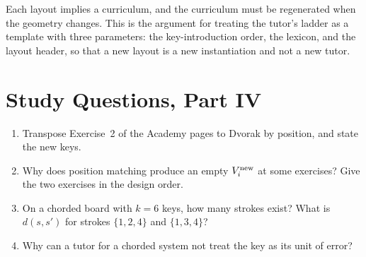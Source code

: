 Each layout implies a curriculum, and the curriculum must be regenerated when the geometry changes. This is the argument for treating the tutor's ladder as a template with three parameters: the key-introduction order, the lexicon, and the layout header, so that a new layout is a new instantiation and not a new tutor.

\chapter*{Study Questions, Part IV}
\begin{enumerate}
\item Transpose Exercise~2 of the Academy pages to Dvorak by position, and state the new keys.
\item Why does position matching produce an empty $V_i^{\mathrm{new}}$ at some exercises? Give the two exercises in the design order.
\item On a chorded board with $k=6$ keys, how many strokes exist? What is $d(s,s')$ for strokes $\{1,2,4\}$ and $\{1,3,4\}$?
\item Why can a tutor for a chorded system not treat the key as its unit of error?
\end{enumerate}
